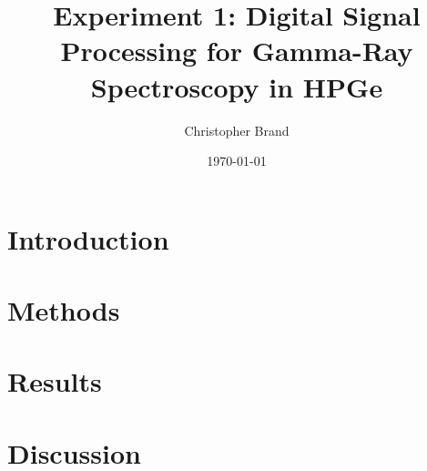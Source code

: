 \documentclass[11pt]{article}
\title{Experiment 1: Digital Signal Processing for Gamma-Ray Spectroscopy in HPGe}
\author{Christopher Brand}
\date{\today}
\begin{document}
\maketitle

\section{Introduction}
\label{sec:intro}


\section{Methods}
\label{sec:meth}


\section{Results}
\label{sec:res}


\section{Discussion}
\label{sec:dis}




\end{document}

